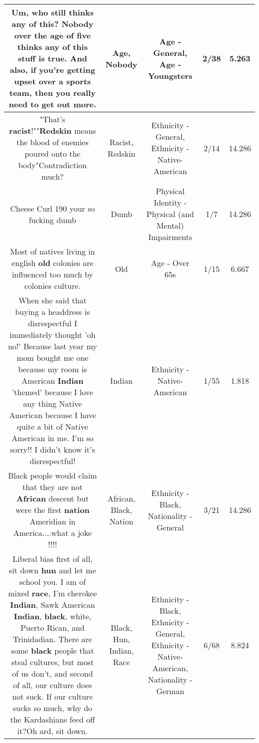 \documentclass[11pt]{article}
\newlength\mylength
\begin{document}
\begin{center}
\begin{longtable}{|C{.65\mylength}|C{.30\mylength}|C{.12\mylength}|C{.12\mylength}|C{.12\mylength}|}
  \small Um, who still thinks any of this? \textbf{Nobody} over the \textbf{age} of five thinks any of this stuff is true. And also, if you're getting upset over a sports team, then you really need to get out more.\normalsize   & Age, Nobody & Age - General, Age - Youngsters & 2/38 & 5.263 \\  \hline
  \small "That's \textbf{racist}!""\textbf{Redskin} means the blood of enemies poured onto the body"Contradiction much?\normalsize   & Racist, Redskin & Ethnicity - General, Ethnicity - Native-American & 2/14 & 14.286 \\  \hline
  \small Cheese Curl 190 your so fucking dumb\normalsize   & Dumb & Physical Identity - Physical (and Mental) Impairments & 1/7 & 14.286 \\  \hline
  \small Most of natives living in english \textbf{old} colonies are influenced too much by colonies culture.\normalsize   & Old & Age - Over 65s & 1/15 & 6.667 \\  \hline
  \small When she said that buying a headdress is disrespectful I immediately thought 'oh no!' Because last year my mom bought me one because my room is American \textbf{Indian} 'themed' because I love any thing Native American because I have quite a bit of Native American in me. I'm so sorry!! I didn't know it's disrespectful!\normalsize   & Indian & Ethnicity - Native-American & 1/55 & 1.818 \\  \hline
  \small Black people would claim that they are not \textbf{African} descent but were the first \textbf{nation} Ameridian in America....what a joke !!!!\normalsize   & African, Black, Nation & Ethnicity - Black, Nationality - General & 3/21 & 14.286 \\  \hline
  \small Liberal bias first of all, sit down \textbf{hun} and let me school you. I am of mixed \textbf{race}, I'm cherokee \textbf{Indian}, Sawk American \textbf{Indian}, \textbf{black}, white, Puerto Rican, and Trinidadian. There are some \textbf{black} people that steal cultures, but most of us don't, and second of all,  our culture does not suck. If our culture sucks so much, why do the Kardashians feed off it?Oh ard, sit down.\normalsize   & Black, Hun, Indian, Race & Ethnicity - Black, Ethnicity - General, Ethnicity - Native-American, Nationality - German & 6/68 & 8.824 \\  \hline

\end{longtable}
\end{center}
\end{document}
